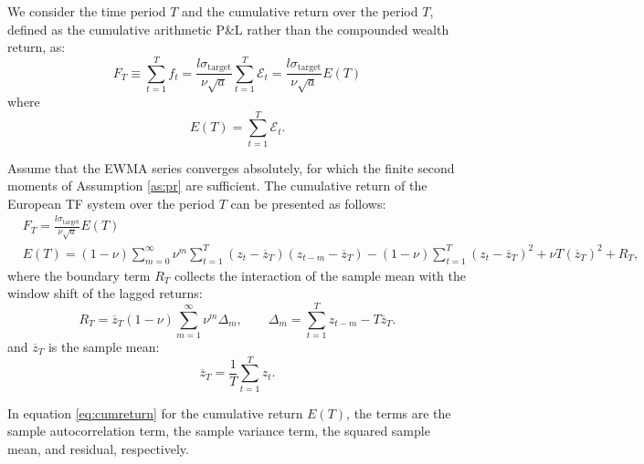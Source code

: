 \documentclass[hidelinks]{siamonline250211}
\begin{document}
We consider the time period $T$ and the cumulative return over the period $T$, defined as the cumulative arithmetic P\&L rather than the compounded wealth return, as:
\begin{equation} \label{eq:e4} 
	F_{T} \equiv \sum^{T}_{t=1}  f_{t} = \frac{l\sigma_{\mathrm{target}} }{\nu\sqrt{a}} \sum^{T}_{t=1}  \mathcal{E}_{t}  = \frac{ l\sigma_{\mathrm{target}} }{\nu\sqrt{a}} E(T)
\end{equation}
where 
\begin{equation} \label{eq:e4a} 
	E(T)= \sum^{T}_{t=1}  \mathcal{E}_{t}.
\end{equation}

\begin{proposition} \label{pr:cumreturn} Assume that the EWMA series converges absolutely, for which the finite second moments of Assumption \ref{as:pr} are sufficient. The cumulative return of the European TF system over the period $T$ can be presented as follows:
	\begin{equation} \label{eq:cumreturn} 
		\begin{split}
			& F_{T} = \frac{ l\sigma_{\mathrm{target}} }{\nu\sqrt{a}} E(T)\\
			& E(T) =   \left(1-\nu \right)  \sum^{\infty}_{m=0} \nu^{m} \sum^{T}_{t=1}  \left( z_{t} -\overline{z}_{T} \right) \left(z_{t-m} -\overline{z}_{T} \right) -  \left(1-\nu \right) \sum^{T}_{t=1} \left(z_{t}-\overline{z}_{T} \right)^{2} + \nu T (\overline{z}_{T})^{2} + R_{T},
		\end{split}
	\end{equation}
	where the boundary term $R_{T}$ collects the interaction of the sample mean with the window shift of the lagged returns:
	\begin{equation} \label{eq:cumreturn_rt}
		R_{T} = \overline{z}_{T}\left(1-\nu \right) \sum^{\infty}_{m=1} \nu^{m} \Delta_{m}, \qquad \Delta_{m} = \sum^{T}_{t=1} z_{t-m} - T\overline{z}_{T}.
	\end{equation}
	and $\overline{z}_{T}$ is the sample mean:
	\begin{equation} \label{eq:mean} 
		\overline{z}_{T} = \frac{1}{T} \sum^{T}_{t=1} z_{t}.
	\end{equation}
	
	In equation \eqref{eq:cumreturn} for the cumulative return $E(T)$, the  terms are the sample autocorrelation term, the sample variance term, the squared sample mean, and residual, respectively.
	
\end{proposition}
\end{document}
